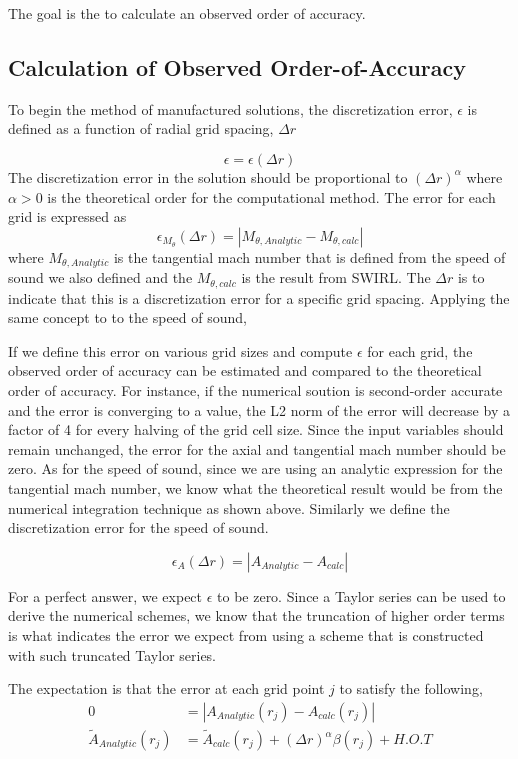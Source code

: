 The goal is the to calculate an observed order of accuracy.
\subsection{Calculation of Observed Order-of-Accuracy}

To begin the method of manufactured solutions, the discretization error,
$\epsilon$ is defined as a function of radial grid spacing, $\Delta r$

\[ \epsilon = \epsilon(\Delta r) \]
The discretization error in the solution should be proportional to 
$\left( \Delta r \right)^{\alpha}$ where $\alpha > 0$ is the theoretical order
for the computational method.  The error for each grid is expressed as 
\[ \epsilon_{M_{\theta}}(\Delta r) = |M_{\theta,Analytic}-M_{\theta,calc}|\]
where $M_{\theta,Analytic}$ is the tangential mach number that is defined from the
speed of sound we also defined and the $M_{\theta,calc}$ is the result from 
SWIRL. The $\Delta r$ is to indicate that this is a discretization error for a
specific grid spacing. Applying the same concept to to the speed of sound,

If we define this error on various grid sizes and compute $\epsilon$ for
each grid, the observed order of accuracy can be estimated and compared to
the theoretical order of accuracy. For instance, if the numerical soution
is second-order accurate and the error is converging to a value, the L2 norm of
the error will decrease by a factor of 4 for every halving of the grid cell 
size. 
Since the input variables should remain unchanged, the error for the axial and tangential mach 
number should be zero. As for the speed of sound, since we are using an analytic
expression for the tangential mach number, we know what the theoretical result
would be from the numerical integration technique as shown above. 
Similarly we define the discretization error for the speed of sound.

\[ \epsilon_{A}(\Delta r) = |A_{Analytic}-A_{calc}|\]

For a perfect answer, we expect $\epsilon$ to be zero. Since a Taylor series can 
be used to derive the numerical schemes, we know that the truncation of higher
order terms is what indicates the error we expect from using a scheme that 
is constructed with such truncated Taylor series.

The expectation is that the error at each grid point $j$ to satisfy the following,
\begin{align*}
    0 &= |A_{Analytic}(r_j) - A_{calc}(r_j)| \\
    \widetilde{A}_{Analytic}(r_j) &= \widetilde{A}_{calc}(r_j) +
    (\Delta r)^{\alpha} \beta(r_j)  + H.O.T
\end{align*}

